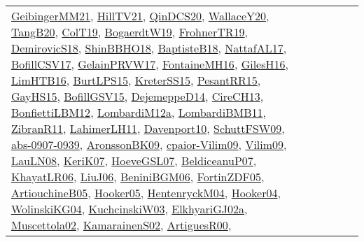 {\begin{longtable}{lp{3cm}>{\raggedright}p{6cm}>{\raggedright}p{6cm}p{8cm}}
\href{papers/GeibingerMM21.pdf}{GeibingerMM21}\cite{GeibingerMM21}, \href{papers/HillTV21.pdf}{HillTV21}\cite{HillTV21}, \href{articles/QinDCS20.pdf}{QinDCS20}\cite{QinDCS20}, \href{articles/WallaceY20.pdf}{WallaceY20}\cite{WallaceY20}, \href{papers/TangB20.pdf}{TangB20}\cite{TangB20}, \href{papers/ColT19.pdf}{ColT19}\cite{ColT19}, \href{papers/BogaerdtW19.pdf}{BogaerdtW19}\cite{BogaerdtW19}, \href{papers/FrohnerTR19.pdf}{FrohnerTR19}\cite{FrohnerTR19}, \href{papers/DemirovicS18.pdf}{DemirovicS18}\cite{DemirovicS18}, \href{articles/ShinBBHO18.pdf}{ShinBBHO18}\cite{ShinBBHO18}, \href{articles/BaptisteB18.pdf}{BaptisteB18}\cite{BaptisteB18}, \href{articles/NattafAL17.pdf}{NattafAL17}\cite{NattafAL17}, \href{papers/BofillCSV17.pdf}{BofillCSV17}\cite{BofillCSV17}, \href{papers/GelainPRVW17.pdf}{GelainPRVW17}\cite{GelainPRVW17}, \href{papers/FontaineMH16.pdf}{FontaineMH16}\cite{FontaineMH16}, \href{papers/GilesH16.pdf}{GilesH16}\cite{GilesH16}, \href{papers/LimHTB16.pdf}{LimHTB16}\cite{LimHTB16}, \href{papers/BurtLPS15.pdf}{BurtLPS15}\cite{BurtLPS15}, \href{papers/KreterSS15.pdf}{KreterSS15}\cite{KreterSS15}, \href{papers/PesantRR15.pdf}{PesantRR15}\cite{PesantRR15}, \href{papers/GayHS15.pdf}{GayHS15}\cite{GayHS15}, \href{papers/BofillGSV15.pdf}{BofillGSV15}\cite{BofillGSV15}, \href{papers/DejemeppeD14.pdf}{DejemeppeD14}\cite{DejemeppeD14}, \href{papers/CireCH13.pdf}{CireCH13}\cite{CireCH13}, \href{papers/BonfiettiLBM12.pdf}{BonfiettiLBM12}\cite{BonfiettiLBM12}, \href{articles/LombardiM12a.pdf}{LombardiM12a}\cite{LombardiM12a}, \href{papers/LombardiBMB11.pdf}{LombardiBMB11}\cite{LombardiBMB11}, \href{papers/ZibranR11.pdf}{ZibranR11}\cite{ZibranR11}, \href{papers/LahimerLH11.pdf}{LahimerLH11}\cite{LahimerLH11}, \href{papers/Davenport10.pdf}{Davenport10}\cite{Davenport10}, \href{papers/SchuttFSW09.pdf}{SchuttFSW09}\cite{SchuttFSW09}, \href{articles/abs-0907-0939.pdf}{abs-0907-0939}\cite{abs-0907-0939}, \href{papers/AronssonBK09.pdf}{AronssonBK09}\cite{AronssonBK09}, \href{papers/cpaior-Vilim09.pdf}{cpaior-Vilim09}\cite{cpaior-Vilim09}, \href{papers/Vilim09.pdf}{Vilim09}\cite{Vilim09}, \href{papers/LauLN08.pdf}{LauLN08}\cite{LauLN08}, \href{papers/KeriK07.pdf}{KeriK07}\cite{KeriK07}, \href{papers/HoeveGSL07.pdf}{HoeveGSL07}\cite{HoeveGSL07}, \href{papers/BeldiceanuP07.pdf}{BeldiceanuP07}\cite{BeldiceanuP07}, \href{articles/KhayatLR06.pdf}{KhayatLR06}\cite{KhayatLR06}, \href{papers/LiuJ06.pdf}{LiuJ06}\cite{LiuJ06}, \href{papers/BeniniBGM06.pdf}{BeniniBGM06}\cite{BeniniBGM06}, \href{papers/FortinZDF05.pdf}{FortinZDF05}\cite{FortinZDF05}, \href{papers/ArtiouchineB05.pdf}{ArtiouchineB05}\cite{ArtiouchineB05}, \href{articles/Hooker05.pdf}{Hooker05}\cite{Hooker05}, \href{papers/HentenryckM04.pdf}{HentenryckM04}\cite{HentenryckM04}, \href{papers/Hooker04.pdf}{Hooker04}\cite{Hooker04}, \href{papers/WolinskiKG04.pdf}{WolinskiKG04}\cite{WolinskiKG04}, \href{articles/KuchcinskiW03.pdf}{KuchcinskiW03}\cite{KuchcinskiW03}, \href{papers/ElkhyariGJ02a.pdf}{ElkhyariGJ02a}\cite{ElkhyariGJ02a}, \href{papers/Muscettola02.pdf}{Muscettola02}\cite{Muscettola02}, \href{papers/KamarainenS02.pdf}{KamarainenS02}\cite{KamarainenS02}, \href{articles/ArtiguesR00.pdf}{ArtiguesR00}\cite{ArtiguesR00}, 
\end{longtable}}
